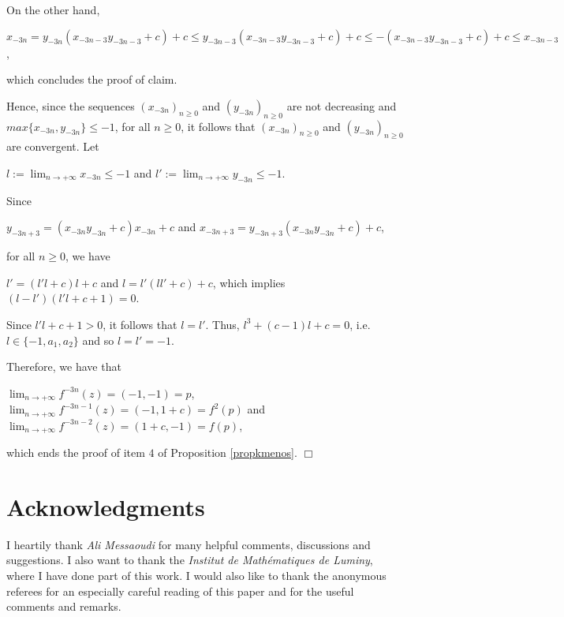 \documentclass[11pt]{amsart}
\theoremstyle{definition}
\begin{document}
On the other hand,
\begin{center}
$x_{-3n}=y_{-3n}(x_{-3n-3}y_{-3n-3}+c)+c \leq y_{-3n-3}(x_{-3n-3}y_{-3n-3}+c)+c\leq -(x_{-3n-3}y_{-3n-3}+c)+c\leq x_{-3n-3}$,
\end{center}
 which concludes the proof of claim.
	
	Hence, since the sequences $(x_{-3n})_{n\geq 0}$ and $(y_{-3n})_{n\geq 0}$ are not decreasing and $max\{x_{-3n},y_{-3n}\}\leq-1$, for all $n\geq 0$, it follows that  $(x_{-3n})_{n\geq 0}$ and $(y_{-3n})_{n\geq 0}$ are convergent. Let
	
	\begin{center}
		$l:=\displaystyle\lim_{n\to+\infty}x_{-3n}\leq-1$ \hspace{.5cm} and \hspace{.5cm} $l':=\displaystyle\lim_{n\to+\infty}y_{-3n}\leq -1$.
	\end{center}
Since
\begin{center}
$y_{-3n+3}=(x_{-3n}y_{-3n}+c)x_{-3n}+c$ and $x_{-3n+3}=y_{-3n+3}(x_{-3n}y_{-3n}+c)+c$,
\end{center}	
for all $n\geq 0$, we have
	
	\begin{center}
		$l'=(l'l+c)l+c$ and $l=l'(ll'+c)+c$, which implies $(l-l')(l'l+c+1)=0$.
	\end{center}
	
	Since $l'l+c+1>0$, it follows that $l=l'$. Thus, $l^3+(c-1)l+c=0$, i.e. $l\in\{-1,a_1,a_2\}$ and so $l=l'=-1$.
	
	Therefore, we have that
	\begin{center}
		$\displaystyle\lim_{n\to+\infty} f^{-3n}(z)=(-1,-1)=p$,
		$\displaystyle\lim_{n\to+\infty} f^{-3n-1}(z)=(-1,1+c)=f^2(p)$ \newline and
		$\displaystyle\lim_{n\to+\infty} f^{-3n-2}(z)=(1+c,-1)=f(p)$,
	\end{center}
which ends the proof of item $4$ of Proposition \ref{propkmenos}. \hfill $\Box$

\section*{Acknowledgments} I heartily thank \emph{Ali Messaoudi} for many helpful comments, discussions and suggestions. I also want to thank the \emph{Institut de Math\'ematiques de Luminy}, where I have done part of this work. I would also like to thank the anonymous referees for an especially careful reading of this paper and for the useful comments and remarks.
\end{document}
